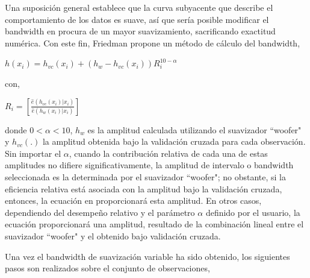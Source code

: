 \hspace*{0.4 cm} Una suposici\'on general establece que la curva subyacente que describe el comportamiento de los datos es suave, as\'i que ser\'ia posible modificar el bandwidth en procura de un mayor suavizamiento, sacrificando exactitud num\'erica. Con este fin, Friedman \cite{F} propone un m\'etodo de c\'alculo del bandwidth,

\vspace*{0.2 cm}

\begin{center}
$\displaystyle{h(x_{i}) = h_{vc}(x_{i}) + (h_{w} - h_{vc}(x_{i}))R_{i}^{10-\alpha}}$
\end{center}

\vspace*{0.2 cm}

\noindent con, 

\vspace*{0.2 cm}

\begin{center}
$\displaystyle{R_{i} = \left[\frac{\hat{e}(h_{vc}(x_{i})|x_{i})}{\hat{e}(h_{w}(x_{i})|x_{i})} \right] }$
\end{center}

\vspace*{0.2 cm}

\noindent donde $0 < \alpha < 10$, $h_{w}$ es la amplitud calculada utilizando 
el suavizador ``woofer"\hspace*{0.01 cm} y $h_{vc}(.)$ la amplitud obtenida bajo la validaci\'on cruzada para cada observaci\'on. Sin importar el $\alpha$, cuando la contribuci\'on relativa de cada una de estas amplitudes no difiere significativamente, la amplitud de intervalo o bandwidth seleccionada es la determinada por el suavizador ``woofer"\hspace*{0.01 cm}; no obstante, si la eficiencia relativa est\'a asociada con la amplitud bajo la validaci\'on cruzada, entonces, la ecuaci\'on en proporcionar\'a esta amplitud. En otros casos, dependiendo del desempe\~no relativo y el par\'ametro $\alpha$ definido por el usuario, la ecuaci\'on proporcionar\'a una amplitud, resultado de la combinaci\'on lineal entre el suavizador ``woofer" \hspace*{0.01 cm} y el obtenido bajo validaci\'on cruzada.

\hspace*{0.4 cm} Una vez el bandwidth de suavizaci\'on variable ha sido obtenido, los siguientes pasos son realizados sobre el conjunto de observaciones,

